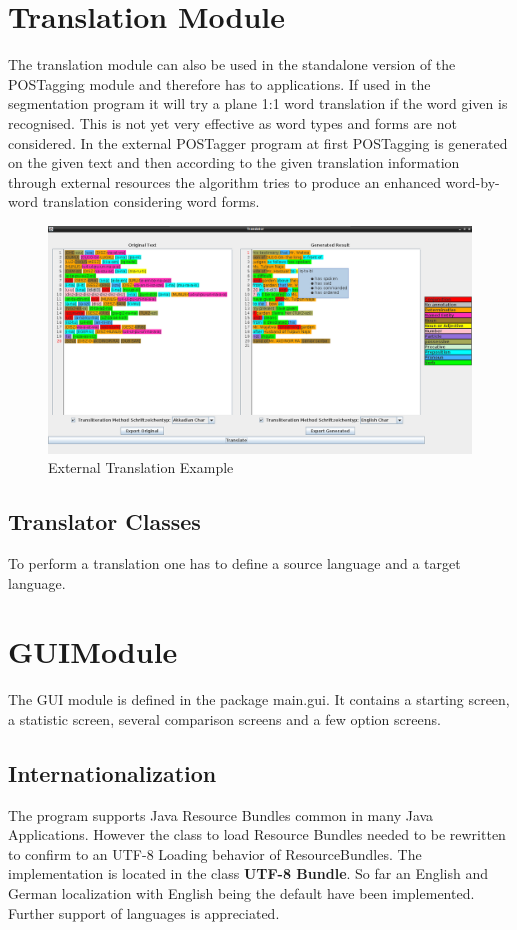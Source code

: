 \documentclass[10pt,a4paper,titlepage]{report}
\begin{document}
	\section{Translation Module}
	The translation module can also be used in the standalone version of the POSTagging module and therefore has to applications. If used in the segmentation program it will try a plane 1:1 word translation if the word given is recognised. This is not yet very effective as word types and forms are not considered. In the external POSTagger program at first  POSTagging is generated on the given text and then according to the given translation information through external resources the algorithm tries to produce an enhanced word-by-word translation considering word forms.
	\begin{figure}[htb]
		\centering
		\includegraphics[width=1\textwidth]{images/translation.png}
		\caption{External Translation Example}
		\label{fig:translation}
	\end{figure}
	\subsection{Translator Classes}
	To perform a translation one has to define a source language and a target language.
	\section{GUIModule}
	\label{sec:guiModule}
	The GUI module is defined in the package main.gui. It contains a starting screen, a statistic screen, several comparison screens and a few option screens.
	\subsection{Internationalization}
	The program supports Java Resource Bundles common in many Java Applications. However the class to load Resource Bundles needed to be rewritten to confirm to an UTF-8 Loading behavior of ResourceBundles. The implementation is located in the class \textbf{UTF-8 Bundle}. So far an English and German localization with English being the default have been implemented. Further support of languages is appreciated.
\end{document}
